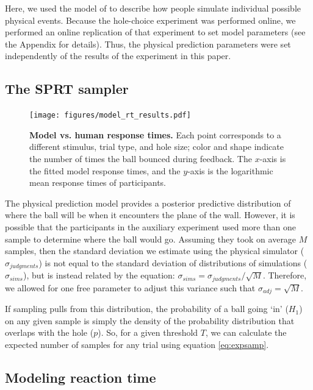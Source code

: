 \documentclass[10pt,letterpaper]{article}
\begin{document}
Here, we used the model of  to describe how people simulate individual possible physical events.
Because the hole-choice experiment was performed online, we performed an online replication of that experiment to set model parameters (see the Appendix for details).
Thus, the physical prediction parameters were set independently of the results of the experiment in this paper.

\subsection{The SPRT sampler}

\begin{figure}[t]
    \begin{center}
        \texttt{[image: figures/model\_rt\_results.pdf]}
        \caption{\textbf{Model vs. human response times.} Each point corresponds to a different stimulus, trial type, and hole size; color and shape indicate the number of times the ball bounced during feedback. The $x$-axis is the fitted model response times, and the $y$-axis is the logarithmic mean response times of participants.}
        \label{fig:model-rt-results}
    \end{center}
\end{figure}

The physical prediction model provides a posterior predictive distribution of where the ball will be when it encounters the plane of the wall.
However, it is possible that the participants in the auxiliary experiment used more than one sample to determine where the ball would go.
Assuming they took on average $M$ samples, then the standard deviation we estimate using the physical simulator ($\sigma_{judgments}$) is not equal to the standard deviation of distributions of simulations ($\sigma_{sims}$), but is instead related by the equation: $\sigma_{sims} = \sigma_{judgments} / \sqrt{M}$.
Therefore, we allowed for one free parameter to adjust this variance such that $\sigma_{adj}=\sqrt{M}$.

If sampling pulls from this distribution, the probability of a ball going `in' ($H_1$) on any given sample is simply the density of the probability distribution that overlaps with the hole ($p$).
So, for a given threshold $T$, we can calculate the expected number of samples for any trial using equation \ref{eq:expsamp}.

\subsection{Modeling reaction time}
\end{document}
